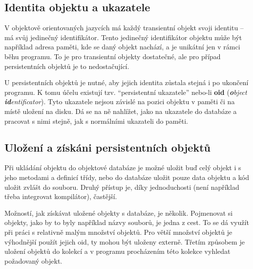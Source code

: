 \subsection{Identita objektu a ukazatele}
V objektově orientovaných jazycích má každý transientní objekt svoji identitu -- má svůj jedinečný identifikátor. Tento jedinečný identifikátor objektu může být například adresa paměti, kde se daný objekt nachází, a je unikátní jen v rámci běhu programu. To je pro transientní objekty dostatečné, ale pro případ persistentních objektů je to nedostačující.

U persistentních objektů je nutné, aby jejich identita zůstala stejná i po ukončení programu. K tomu účelu existují tzv. "`persistentní ukazatele"' nebo-li \textbf{oid} (\textit{\textbf{o}bject \textbf{id}entificator}). Tyto ukazatele nejsou závislé na pozici objektu v paměti či na místě uložení na disku. Dá se na ně nahlížet, jako na ukazatele do databáze a pracovat s nimi stejně, jak s normálními ukazateli do paměti.

\subsection{Uložení a získáni persistentních objektů}
Při ukládání objektu do objektové databáze je možné uložit buď celý objekt i s jeho metodami a definicí třídy, nebo do databáze uložit pouze data objektu a kód uložit zvlášt do souboru. Druhý přístup je, díky jednoduchosti (není například třeba integrovat kompilátor), častější.

Možností, jak získávat uložené objekty s databáze, je několik. Pojmenovat si objekty, jako by to byly například názvy souborů, je jedna z cest. To se dá využít při práci s relativně malým množství objektů. Pro větší množství objektů je výhodnější použít jejich oid, ty mohou být uloženy externě. Třetím způsobem je uložení objektů do kolekcí a v programu procházením této kolekce vyhledat požadovaný objekt. 
